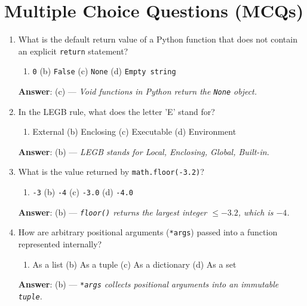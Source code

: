 \section{Multiple Choice Questions (MCQs)}

\begin{enumerate}[leftmargin=1.5em]
    \item What is the default return value of a Python function that does not contain an explicit \texttt{return} statement?
    \begin{enumerate}[label=(\alph*)]
        \item \texttt{0} \quad (b) \texttt{False} \quad (c) \texttt{None} \quad (d) \texttt{Empty string}
    \end{enumerate}
    \textbf{Answer}: (c) --- \textit{Void functions in Python return the \texttt{None} object.}

    \item In the LEGB rule, what does the letter 'E' stand for?
    \begin{enumerate}[label=(\alph*)]
        \item External \quad (b) Enclosing \quad (c) Executable \quad (d) Environment
    \end{enumerate}
    \textbf{Answer}: (b) --- \textit{LEGB stands for Local, Enclosing, Global, Built-in.}

    \item What is the value returned by \texttt{math.floor(-3.2)}?
    \begin{enumerate}[label=(\alph*)]
        \item \texttt{-3} \quad (b) \texttt{-4} \quad (c) \texttt{-3.0} \quad (d) \texttt{-4.0}
    \end{enumerate}
    \textbf{Answer}: (b) --- \textit{\texttt{floor()} returns the largest integer $\le -3.2$, which is $-4$.}

    \item How are arbitrary positional arguments (\texttt{*args}) passed into a function represented internally?
    \begin{enumerate}[label=(\alph*)]
        \item As a list \quad (b) As a tuple \quad (c) As a dictionary \quad (d) As a set
    \end{enumerate}
    \textbf{Answer}: (b) --- \textit{\texttt{*args} collects positional arguments into an immutable \texttt{tuple}.}


\end{enumerate}
